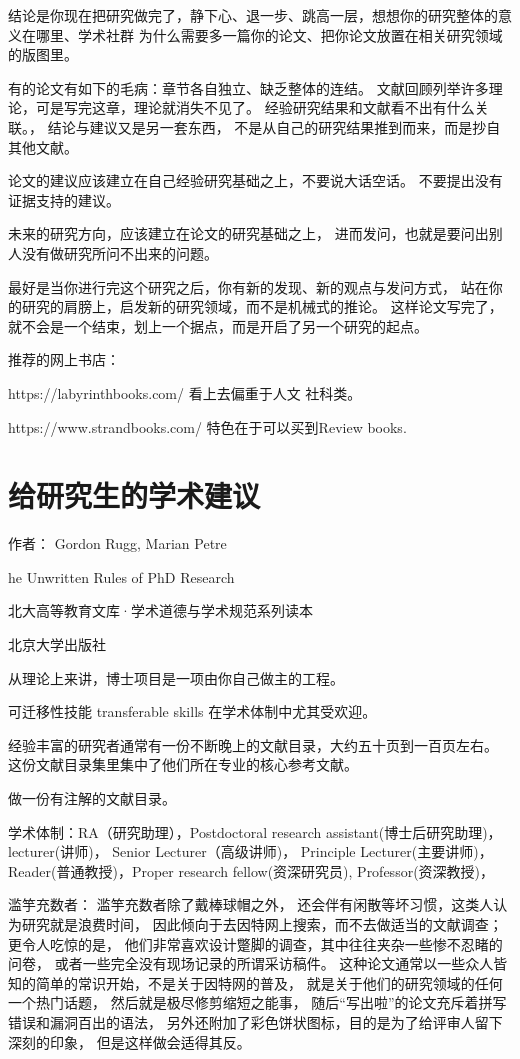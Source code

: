 结论是你现在把研究做完了，静下心、退一步、跳高一层，想想你的研究整体的意义在哪里、学术社群
为什么需要多一篇你的论文、把你论文放置在相关研究领域的版图里。

有的论文有如下的毛病：章节各自独立、缺乏整体的连结。
文献回顾列举许多理论，可是写完这章，理论就消失不见了。
经验研究结果和文献看不出有什么关联。，
结论与建议又是另一套东西，
不是从自己的研究结果推到而来，而是抄自其他文献。

论文的建议应该建立在自己经验研究基础之上，不要说大话空话。
不要提出没有证据支持的建议。

未来的研究方向，应该建立在论文的研究基础之上，
进而发问，也就是要问出别人没有做研究所问不出来的问题。

最好是当你进行完这个研究之后，你有新的发现、新的观点与发问方式，
站在你的研究的肩膀上，启发新的研究领域，而不是机械式的推论。
这样论文写完了，就不会是一个结束，划上一个据点，而是开启了另一个研究的起点。


推荐的网上书店：

https://labyrinthbooks.com/
看上去偏重于人文 社科类。

https://www.strandbooks.com/
特色在于可以买到Review books.


\section{给研究生的学术建议 }

作者：  Gordon Rugg, Marian Petre

he Unwritten Rules of PhD Research

北大高等教育文库·学术道德与学术规范系列读本

北京大学出版社


从理论上来讲，博士项目是一项由你自己做主的工程。

可迁移性技能 transferable skills 在学术体制中尤其受欢迎。

经验丰富的研究者通常有一份不断晚上的文献目录，大约五十页到一百页左右。
这份文献目录集里集中了他们所在专业的核心参考文献。

做一份有注解的文献目录。


学术体制：RA（研究助理），Postdoctoral research assistant(博士后研究助理)，
lecturer(讲师)， Senior Lecturer（高级讲师)， Principle Lecturer(主要讲师)，
Reader(普通教授)，Proper research fellow(资深研究员),  Professor(资深教授)， 

滥竽充数者： 
滥竽充数者除了戴棒球帽之外， 还会伴有闲散等坏习惯，这类人认为研究就是浪费时间，
因此倾向于去因特网上搜索，而不去做适当的文献调查；
更令人吃惊的是， 他们非常喜欢设计蹩脚的调查，其中往往夹杂一些惨不忍睹的问卷，
或者一些完全没有现场记录的所谓采访稿件。
这种论文通常以一些众人皆知的简单的常识开始，不是关于因特网的普及， 
就是关于他们的研究领域的任何一个热门话题，
然后就是极尽修剪缩短之能事， 随后“写出啦”的论文充斥着拼写错误和漏洞百出的语法，
另外还附加了彩色饼状图标，目的是为了给评审人留下深刻的印象，
但是这样做会适得其反。

